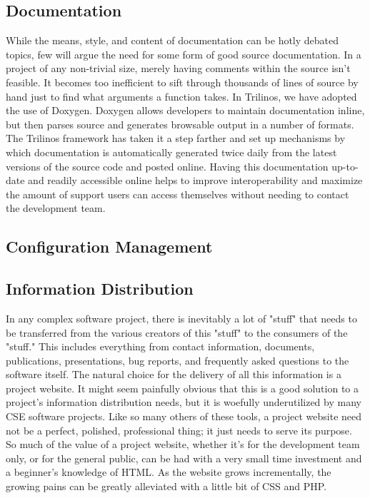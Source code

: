 \documentclass[12pt,relax]{article}
\begin{document}
\subsection{Documentation}


While the means, style, and content of documentation can be hotly debated
topics, few will argue the need for some form of good source documentation.
In a project of any non-trivial size, merely having comments within the source
isn't feasible.  It becomes too inefficient to sift through thousands of lines
of source by hand just to find what arguments a function takes.  In Trilinos,
we have adopted the use of Doxygen.  Doxygen allows developers to maintain
documentation inline, but then parses source and generates browsable output in
a number of formats.  The Trilinos framework has taken it a step farther and
set up mechanisms by which documentation is automatically generated twice daily
from the latest versions of the source code and posted online.  Having this
documentation up-to-date and readily accessible online helps to improve
interoperability and maximize the amount of support users can access
themselves without needing to contact the development team.

\subsection{Configuration Management}


\subsection{Information Distribution}


In any complex software project, there is inevitably a lot of "stuff" that
needs to be transferred from the various creators of this "stuff" to the
consumers of the "stuff."  This includes everything from contact information,
documents, publications, presentations, bug reports, and frequently asked
questions to the software itself.  The natural choice for the delivery of all
this information is a project website.  It might seem painfully obvious that
this is a good solution to a project's information distribution needs, but it
is woefully underutilized by many CSE software projects.  Like so many others
of these tools, a project website need not be a perfect, polished, professional
thing; it just needs to serve its purpose.  So much of the value of a project
website, whether it's for the development team only, or for the general
public, can be had with a very small time investment and a beginner's
knowledge of HTML.  As the website grows incrementally, the growing pains can
be greatly alleviated with a little bit of CSS and PHP.
\end{document}
